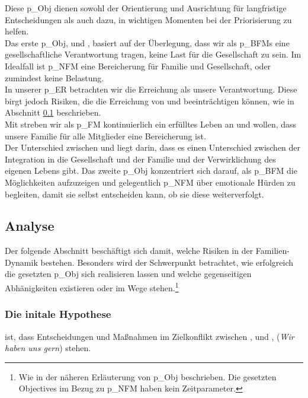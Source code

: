 Diese \gls{p_Obj} dienen sowohl der Orientierung und Ausrichtung für langfristige Entscheidungen als auch dazu, in wichtigen Momenten bei der Priorisierung zu helfen.\\

Das erste \gls{p_Obj}, \NFMOOne und \NFMOTwo, basiert auf der Überlegung, dass wir als \glspl{p_BFM} eine gesellschaftliche Verantwortung tragen, keine Last für die Gesellschaft zu sein. Im Idealfall ist \gls{p_NFM} eine Bereicherung für Familie und Gesellschaft, oder zumindest keine Belastung.\\

In unserer \gls{p_ER} betrachten wir die Erreichung als unsere Verantwortung. Diese birgt jedoch Risiken, die die Erreichung von \NFMOTwo und \NFMOThree beeinträchtigen können, wie in Abschnitt \ref{sec:Risiko_EKB} beschrieben.\\

Mit \NFMOFour streben wir als \gls{p_FM} kontinuierlich ein erfülltes Leben an und wollen, dass unsere Familie für alle Mitglieder eine Bereicherung ist.\\

Der Unterschied zwischen \NFMOOne und \NFMOFour liegt darin, dass es einen Unterschied zwischen der Integration in die Gesellschaft und der Familie und der Verwirklichung des eigenen Lebens gibt. Das zweite \gls{p_Obj} konzentriert sich darauf, als \gls{p_BFM} die Möglichkeiten aufzuzeigen und gelegentlich \gls{p_NFM} über emotionale Hürden zu begleiten, damit sie selbst entscheiden kann, ob sie diese weiterverfolgt.

\subsection{Analyse} \label{sec:Risiko_EKB}
Der folgende Abschnitt beschäftigt sich damit, welche Risiken in der Familien-Dynamik bestehen. Besonders wird der Schwerpunkt betrachtet, wie erfolgreich die gesetzten \gls{p_Obj} sich realisieren lassen und welche gegenseitigen Abhänigkeiten existieren oder im Wege stehen.\footnote{
	Wie in der näheren Erläuterung von \gls{p_Obj} beschrieben. Die gesetzten Objectives im Bezug zu \gls{p_NFM} haben kein Zeitparameter.
}

\subsubsection{Die initale Hypothese} ist, dass Entscheidungen und Maßnahmen im Zielkonflikt zwischen \NFMOOne, \NFMOTwo und \NFMOThree, \NFMOFour (\textit{Wir haben uns gern}) stehen.\\

